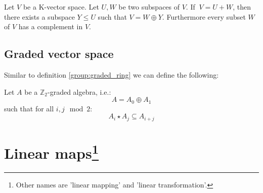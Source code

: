         \begin{theorem}
			\label{linalgebra:theorem:complement}
            Let $V$ be a K-vector space. Let $U,W$ be two subspaces of $V$. If $\ V = U+W$, then there exists a subspace $Y\leq U$ such that $V = W\oplus Y$. Furthermore every subset $W$ of $V$ has a complement in $V$.
		\end{theorem}
        
\subsection{Graded vector space}
	Similar to definition \ref{group:graded_ring} we can define the following:
	
	
	\begin{example}[Superalgebra]\label{linalgebra:superalgebra}
		Let $A$ be a $\mathbb{Z}_2$-graded algebra, i.e.:
		\begin{equation}
			A = A_0\oplus A_1
		\end{equation}
		such that for all $i, j \mod 2$:
		\begin{equation}
			A_i\star A_j \subseteq A_{i+j}
		\end{equation}
	\end{example}
        
\section[Linear maps]{Linear maps\footnote{Other names are 'linear mapping' and 'linear transformation'.}}
	
